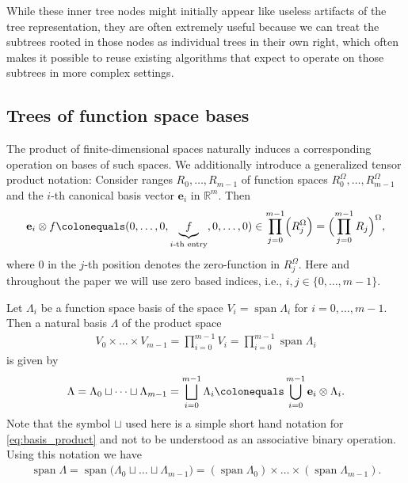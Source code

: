 \documentclass[a4paper,10pt,headings=normal,bibliography=totoc]{scrartcl}
\newcommand{\R}{\mathbb{R}}
\begin{document}
While these inner tree nodes might initially appear like useless artifacts of the tree representation, they are often extremely useful
because we can treat the subtrees rooted in those nodes as individual trees in their own right, which often makes it possible to
reuse existing algorithms that expect to operate on those subtrees in more complex settings.


\subsection{Trees of function space bases}
\label{sec:basistree}

The product of finite-dimensional spaces naturally induces a corresponding operation on bases
of such spaces.  We additionally introduce a generalized tensor product notation:
Consider ranges $R_0,\dots,R_{m-1}$ of function spaces $R_0^\Omega,\dots,R_{m-1}^\Omega$
and the $i$-th canonical basis vector $\mathbf{e}_i$ in $\R^m$.
Then
\begin{align*}
  \mathbf{e}_i \otimes f
  \colonequals (0,\dots,0,\underbrace{f}_{\text{$i$-th entry}},0,\dots,0)
  \in \prod_{j=0}^{m-1} \Bigl(R_j^\Omega\Bigr) = \Bigl(\prod_{j=0}^{m-1} R_j\Bigr)^\Omega,
\end{align*}
where $0$ in the $j$-th position denotes the zero-function in $R_j^\Omega$.
Here and throughout the paper we will use zero based indices, i.e., $i,j\in \{0,\dots,m-1\}$.


Let $\Lambda_i$ be a function space basis of the space $V_i = \operatorname{span} \Lambda_i$
for $i=0,\dots,m-1$. Then a natural basis $\Lambda$ of the product space
\begin{align*}
  V_0 \times \dots \times V_{m-1}
  = \prod_{i=0}^{m-1} V_i
  = \prod_{i=0}^{m-1} \operatorname{span}\Lambda_i
\end{align*}
is given by
\begin{align}
  \label{eq:basis_product}
  \Lambda =
    \Lambda_0 \sqcup \dots \sqcup \Lambda_{m-1}
    = \bigsqcup_{i=0}^{m-1} \Lambda_i
    \colonequals \bigcup_{i=0}^{m-1} \mathbf{e}_i \otimes \Lambda_i.
\end{align}
Note that the symbol $\sqcup$ used here
is a simple short hand notation for \eqref{eq:basis_product}
and not to be understood as an associative binary operation.
Using this notation we have
\begin{align*}
  \operatorname{span} \Lambda
    = \operatorname{span} \bigl( \Lambda_0 \sqcup \dots \sqcup \Lambda_{m-1} \bigr)
    = (\operatorname{span} \Lambda_0) \times \dots \times (\operatorname{span} \Lambda_{m-1}).
\end{align*}
\end{document}
